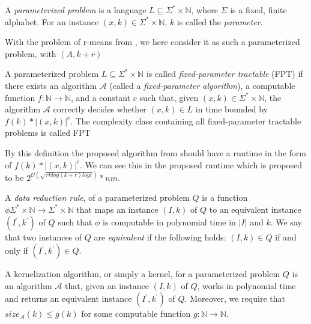 \documentclass[a4paper]{article}
\begin{document}
\begin{theoremdefinition}{\cite[p.~12]{param_algo_book}}
    A \textit{parameterized problem} is a language $L \subseteq \Sigma^* \times \mathbb{N}$,
    where $\Sigma$ is a fixed, finite alphabet. For an instance $(x,k) \in \Sigma^* \times \mathbb{N}$,
    $k$ is called the \textit{parameter}.
\end{theoremdefinition}

With the problem of r-means from \cite{fomin_golovach_panolan_2020}, we here consider it as such
a parameterized problem, with $(A,k+r)$

\begin{theoremdefinition}{\cite[p.~13]{param_algo_book}}
    A parameterized problem $L \subseteq \Sigma^* \times \mathbb{N}$ is called
    \textit{fixed-parameter tractable} (FPT) if there exists an algorithm $\mathcal{A}$ (called
    a \textit{fixed-parameter algorithm}), a computable function $f:\mathbb{N} \rightarrow \mathbb{N}$,
    and a constant $c$ such that, given $(x,k) \in \Sigma^* \times \mathbb{N}$, the algorithm
    $\mathcal{A}$ correctly decides whether $(x,k) \in L$ in time bounded by $f(k) * |(x,k)|^c$.
    The complexity class containing all fixed-parameter tractable problems is called FPT
\end{theoremdefinition}

By this definition the proposed algorithm from \cite{fomin_golovach_panolan_2020} should have
a runtime in the form of $f(k) * |(x,k)|^c$. We can see this in the proposed runtime which is
proposed to be $2^{\mathcal{O} (\sqrt{rk log(k+r) logr})}*nm$.

\begin{theoremdefinition}{\cite[p.~18]{param_algo_book}}
    A \textit{data reduction rule}, of a parameterized problem $Q$ is a function
    $\phi \Sigma^* \times \mathbb{N} \rightarrow \Sigma^* \times \mathbb{N}$
    that maps an instance $(I,k)$ of $Q$ to an equivalent
    instance $(I^\prime, k^\prime)$ of $Q$ such that $\phi$ is computable in polynomial time
    in $|I|$ and $k$. We say that two instances of $Q$ are \textit{equivalent} if the following
    holds: $(I,k) \in Q$ if and only if $(I^\prime, k^\prime) \in Q$.
\end{theoremdefinition}

\begin{theoremdefinition}{\cite[p.~18]{param_algo_book} \label{def:kernelization}}
    A kernelization algorithm, or simply a kernel, for a parameterized problem $Q$
    is an algorithm $\mathcal{A}$ that, given an instance $(I,k)$ of $Q$, works in polynomial
    time and returns an equivalent instance $(I^\prime, k^\prime)$ of $Q$. Moreover, we require
    that $size_{\mathcal{A}}(k) \leq g(k)$ for some computable function
    $g: \mathbb{N} \rightarrow \mathbb{N}$.
\end{theoremdefinition}
\end{document}
